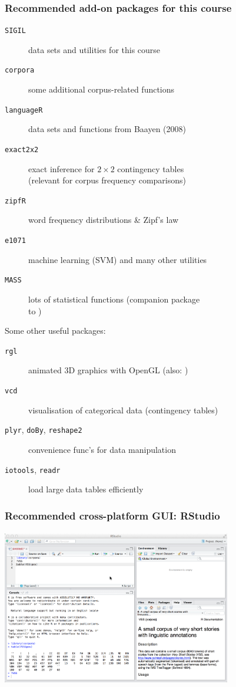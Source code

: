 \documentclass[t]{beamer} %
\begin{document}
\begin{frame}
  \frametitle{Recommended add-on packages for this course}

  \begin{description}
  \item[\texttt{SIGIL}] data sets and utilities for this course
  \item[\texttt{corpora}] some additional corpus-related functions
  \item[\texttt{languageR}] data sets and functions from Baayen (2008)
  \item[\texttt{exact2x2}] exact inference for $2\times 2$ contingency
    tables\\ (relevant for corpus frequency comparisons)
  \item[\texttt{zipfR}] word frequency distributions \& Zipf's law
  \item[\texttt{e1071}] machine learning (SVM) and many other utilities
  \item[\texttt{MASS}] lots of statistical functions (companion package\\
    to )
  \end{description}

  \gap[.5]
  Some other useful packages:
  \begin{description}
  \item[\texttt{rgl}] animated 3D graphics with OpenGL (also: )
  \item[\texttt{vcd}] visualisation of categorical data (contingency tables)
  \item[\texttt{plyr}, \texttt{doBy}, \texttt{reshape2}] convenience func's for data manipulation
  \item[\texttt{iotools}, \texttt{readr}] load large data tables efficiently 
  \end{description}
\end{frame}

\begin{frame}[fragile]
  \frametitle{Recommended cross-platform GUI: RStudio}
  \framesubtitle{}

  \centering
  \includegraphics[width=10cm]{img/rstudio}

\end{frame}
\end{document}
